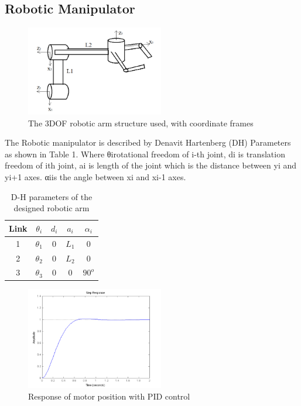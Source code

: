 \documentclass[conference]{IEEEtran}
\begin{document}
\subsection{Robotic Manipulator}
\begin{figure}[h]
\includegraphics[width=6cm]{roboticarm.png}
\centering
\caption{The 3DOF robotic arm structure used, with coordinate frames}\label{net_img}
\end{figure}
The Robotic manipulator is described by Denavit Hartenberg (DH) Parameters as shown in Table 1. Where θirotational freedom of i-th joint, di  is translation freedom of ith joint, ai is  length of the joint which is the distance between yi and yi+1 axes. αiis the angle between xi and xi-1 axes.
\begin{table}[htdp]
\begin{center}
  \begin{tabular}{ | c | c |c|c|c|}
    \hline
    Link  & $\theta_i$ & $d_i$ & $a_i$ & $\alpha_i$ \\ \hline
    1     & $\theta_1$ & 0     & $L_1$ & 0\\ \hline 
    2     & $\theta_2$ & 0     & $L_2$ & 0 \\ \hline
    3     & $\theta_3$ & 0     & 0     & $90^o$ \\ \hline

  \end{tabular}
\end{center}
 \caption{D-H parameters of the designed robotic arm}\label{tab:a}
\end{table}

\begin{figure}[h]
\includegraphics[width=6cm]{pidresponse.png}
\centering
\caption{Response of motor position with PID control}\label{net_img}
\end{figure}
\end{document}
